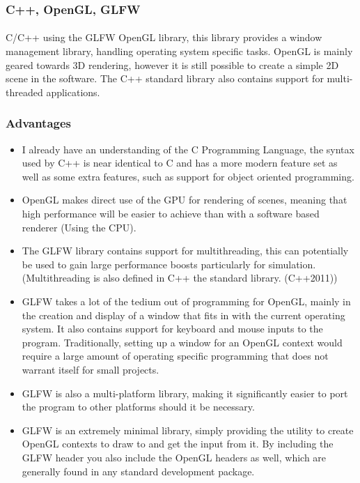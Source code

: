 \subsubsection{C++, OpenGL, GLFW}
\paragraph{}
C/C++ using the GLFW OpenGL library, this library provides a window management library, handling operating system specific tasks. OpenGL is mainly geared towards 3D rendering, however it is still possible to create a simple 2D scene in the software. The C++ standard library also contains support for multi-threaded applications.
\subsubsection*{Advantages}
\begin{itemize}
\item I already have an understanding of the C Programming Language, the syntax used by C++ is near identical to C and has a more modern feature set as well as some extra features, such as support for object oriented programming.
\item OpenGL makes direct use of the GPU for rendering of scenes, meaning that high performance will be easier to achieve than with a software based renderer (Using the CPU).
\item The GLFW library contains support for multithreading, this can potentially be used to gain large performance boosts particularly for simulation. (Multithreading is also defined in C++ the standard library. (C++2011))
\item GLFW takes a lot of the tedium out of programming for OpenGL, mainly in the creation and display of a window that fits in with the current operating system. It also contains support for keyboard and mouse inputs to the program. Traditionally, setting up a window for an OpenGL context would require a large amount of operating specific programming that does not warrant itself for small projects.
\item GLFW is also a multi-platform library, making it significantly easier to port the program to other platforms should it be necessary. 
\item GLFW is an extremely minimal library, simply providing the utility to create OpenGL contexts to draw to and get the input from it. By including the GLFW header you also include the OpenGL headers as well, which are generally found in any standard development package.
\end{itemize}
